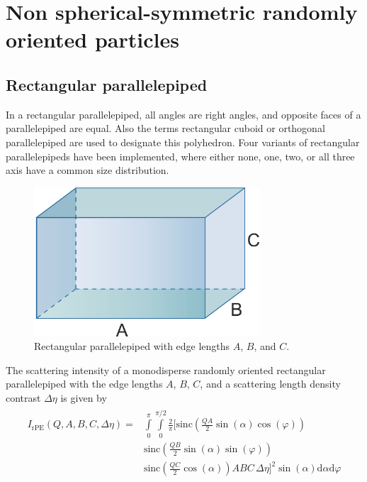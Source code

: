 
\section{Non spherical-symmetric randomly oriented particles}
\label{sec:anisotropic_randomlyoriented_particles}
\subsection{Rectangular parallelepiped}
\label{sec:reccuboid}
In a rectangular parallelepiped, all angles are right angles, and opposite faces of a parallelepiped are equal. Also the terms rectangular cuboid or orthogonal parallelepiped are used to designate this polyhedron. Four variants of rectangular parallelepipeds have been implemented, where either none, one, two, or all three axis have a common size distribution.
\begin{figure}[htb]
\begin{center}
\includegraphics[width=0.75\textwidth]{../images/form_factor/anisotropic/rectangularparallelepiped.png}
\end{center}
\caption{Rectangular parallelepiped with edge lengths $A$, $B$, and $C$.}
\label{fig:recparallelepiped}
\end{figure}
The scattering intensity of a monodisperse randomly oriented rectangular parallelepiped with the edge lengths $A$, $B$, $C$, and a scattering length density contrast $\Delta\eta$ is given by
\begin{align}
\begin{split}
I_\text{rPE}(Q,A,B,C,\Delta\eta) = & \int\limits_0^\pi\int\limits_0^{\pi/2}
\frac{2}{\pi} \Bigg[ \textrm{sinc}\left(\frac{QA}{2} \sin(\alpha) \cos(\varphi)\right)  \\
				     &\textrm{sinc}\left(\frac{QB}{2} \sin(\alpha) \sin(\varphi)\right) \\
		             &\textrm{sinc}\left(\frac{QC}{2} \cos(\alpha)\right) ABC\, \Delta\eta \Bigg]^2  \sin\left(\alpha\right) \mathrm{d}\alpha \mathrm{d}\varphi
\end{split}
\end{align}
